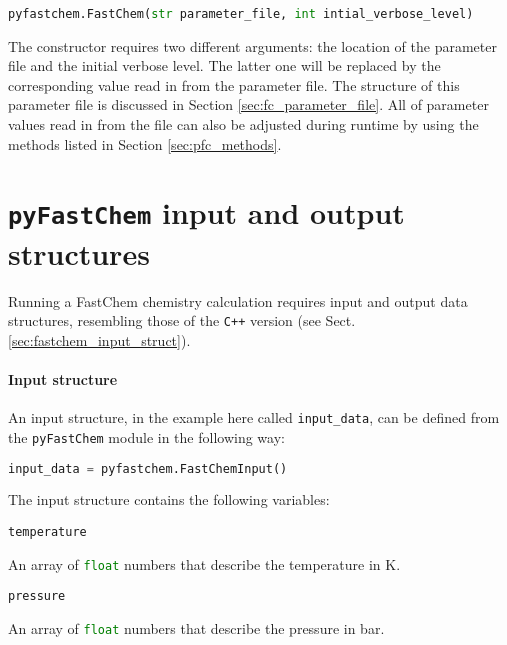 \documentclass[numbers=noenddot]{aux/fcmanual}
\newcommand{\pfc}{\texttt{pyFastChem}\xspace}
\newcommand{\cpp}{\ttt{C++}\xspace}
\newcommand{\ttt}[1]{\texttt {#1}}
\begin{document}
\bigbreak

\lstinline[language=Python]!pyfastchem.FastChem(str parameter_file, int intial_verbose_level)!
\begin{addmargin}[25pt]{0pt}
	The constructor requires two different arguments: the location of the parameter file and the initial verbose level. The latter one will be replaced by the corresponding value read in from the parameter file. The structure of this parameter file is discussed in Section \ref{sec:fc_parameter_file}. All of parameter values read in from the file can also be adjusted during runtime by using the methods listed in Section \ref{sec:pfc_methods}.
\end{addmargin}



\section{\pfc input and output structures}
\label{sec:pfc_input_ouput_struct}

Running a FastChem chemistry calculation requires input and output data structures, resembling those of the \cpp version (see Sect. \ref{sec:fastchem_input_struct}). 

\paragraph{Input structure}
An input structure, in the example here called \lstinline!input_data!, can be defined from the \pfc module in the following way:
\begin{lstlisting}[language=Python]
  input_data = pyfastchem.FastChemInput()
\end{lstlisting}

The input structure contains the following variables:

\bigbreak

\lstinline[language=Python]!temperature!
\begin{addmargin}[25pt]{0pt}
	An array of \lstinline[language=Python]!float! numbers that describe the temperature in K.
\end{addmargin}

\bigbreak

\lstinline[language=Python]!pressure!
\begin{addmargin}[25pt]{0pt}
	An array of \lstinline[language=Python]!float! numbers that describe the pressure in bar.
\end{addmargin}
\end{document}
